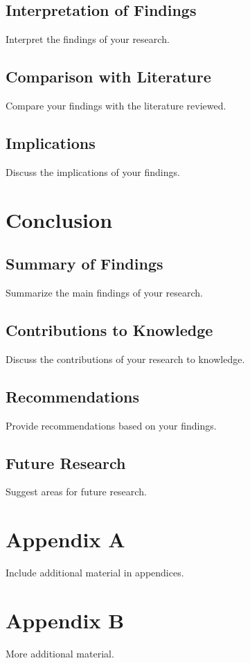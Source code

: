 \documentclass[12pt, oneside]{book}
\begin{document}
\section{Interpretation of Findings}
Interpret the findings of your research.

\section{Comparison with Literature}
Compare your findings with the literature reviewed.

\section{Implications}
Discuss the implications of your findings.

\clearpage
\chapter{Conclusion}
\section{Summary of Findings}
Summarize the main findings of your research.

\section{Contributions to Knowledge}
Discuss the contributions of your research to knowledge.

\section{Recommendations}
Provide recommendations based on your findings.

\section{Future Research}
Suggest areas for future research.

\clearpage
\begin{appendices}
\chapter{Appendix A}
Include additional material in appendices.

\chapter{Appendix B}
More additional material.
\end{appendices}

\clearpage
\printbibliography

\clearpage
\printindex
\end{document}
